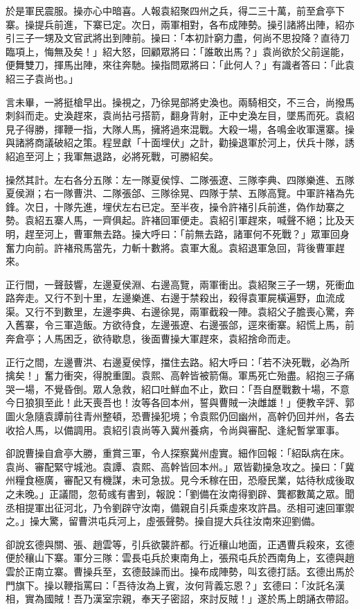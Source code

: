 於是軍民震服。操亦心中暗喜。人報袁紹聚四州之兵，得二三十萬，前至倉亭下寨。操提兵前進，下寨已定。次日，兩軍相對，各布成陣勢。操引諸將出陣，紹亦引三子一甥及文官武將出到陣前。操曰：「本初計窮力盡，何尚不思投降？直待刀臨項上，悔無及矣！」紹大怒，回顧眾將曰：「誰敢出馬？」袁尚欲於父前逞能，便舞雙刀，揮馬出陣，來往奔馳。操指問眾將曰：「此何人？」有識者答曰：「此袁紹三子袁尚也。」

言未畢，一將挺槍早出。操視之，乃徐晃部將史渙也。兩騎相交，不三合，尚撥馬刺斜而走。史渙趕來，袁尚拈弓搭箭，翻身背射，正中史渙左目，墜馬而死。袁紹見子得勝，揮鞭一指，大隊人馬，擁將過來混戰。大殺一場，各鳴金收軍還寨。操與諸將商議破紹之策。程昱獻「十面埋伏」之計，勸操退軍於河上，伏兵十隊，誘紹追至河上；我軍無退路，必將死戰，可勝紹矣。

操然其計。左右各分五隊：左一隊夏侯惇、二隊張遼、三隊李典、四隊樂進、五隊夏侯淵；右一隊曹洪、二隊張郃、三隊徐晃、四隊于禁、五隊高覽。中軍許褚為先鋒。次日，十隊先進，埋伏左右已定。至半夜，操令許褚引兵前進，偽作劫寨之勢。袁紹五寨人馬，一齊俱起。許褚回軍便走。袁紹引軍趕來，喊聲不絕；比及天明，趕至河上，曹軍無去路。操大呼曰：「前無去路，諸軍何不死戰？」眾軍回身奮力向前。許褚飛馬當先，力斬十數將。袁軍大亂。袁紹退軍急回，背後曹軍趕來。

正行間，一聲鼓響，左邊夏侯淵、右邊高覽，兩軍衝出。袁紹聚三子一甥，死衝血路奔走。又行不到十里，左邊樂進、右邊于禁殺出，殺得袁軍屍橫遍野，血流成渠。又行不到數里，左邊李典、右邊徐晃，兩軍截殺一陣。袁紹父子膽喪心驚，奔入舊寨，令三軍造飯。方欲待食，左邊張遼、右邊張郃，逕來衝寨。紹慌上馬，前奔倉亭；人馬困乏，欲待歇息，後面曹操大軍趕來，袁紹捨命而走。

正行之間，左邊曹洪、右邊夏侯惇，擋住去路。紹大呼曰：「若不決死戰，必為所擒矣！」奮力衝突，得脫重圍。袁熙、高幹皆被箭傷。軍馬死亡殆盡。紹抱三子痛哭一場，不覺昏倒。眾人急救，紹口吐鮮血不止，歎曰：「吾自歷戰數十場，不意今日狼狽至此！此天喪吾也！汝等各回本州，誓與曹賊一決雌雄！」便教辛評、郭圖火急隨袁譚前往青州整頓，恐曹操犯境；令袁熙仍回幽州，高幹仍回并州，各去收拾人馬，以備調用。袁紹引袁尚等入冀州養病，令尚與審配、逢紀暫掌軍事。

卻說曹操自倉亭大勝，重賞三軍，令人探察冀州虛實。細作回報：「紹臥病在床。袁尚、審配緊守城池。袁譚、袁熙、高幹皆回本州。」眾皆勸操急攻之。操曰：「冀州糧食極廣，審配又有機謀，未可急拔。見今禾稼在田，恐廢民業，姑待秋成後取之未晚。」正議間，忽荀彧有書到，報說：「劉備在汝南得劉辟、龔都數萬之眾。聞丞相提軍出征河北，乃令劉辟守汝南，備親自引兵乘虛來攻許昌。丞相可速回軍禦之。」操大驚，留曹洪屯兵河上，虛張聲勢。操自提大兵往汝南來迎劉備。

卻說玄德與關、張、趙雲等，引兵欲襲許都。行近穰山地面，正遇曹兵殺來，玄德便於穰山下寨。軍分三隊：雲長屯兵於東南角上，張飛屯兵於西南角上，玄德與趙雲於正南立寨。曹操兵至，玄德鼓譟而出。操布成陣勢，叫玄德打話。玄德出馬於門旗下。操以鞭指罵曰：「吾待汝為上賓，汝何背義忘恩？」玄德曰：「汝託名漢相，實為國賊！吾乃漢室宗親，奉天子密詔，來討反賊！」遂於馬上朗誦衣帶詔。

